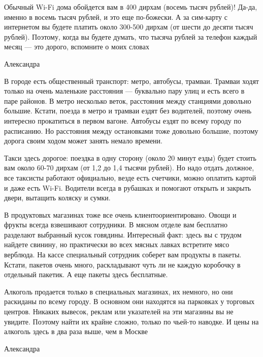 \begin{fancyquotes}
    Обычный Wi-Fi дома обойдется вам в 400 дирхам (восемь тысяч рублей)! Да-да, именно в восемь тысяч рублей, и это еще по-божески. А за сим-карту с интернетом вы будете платить около 300-500 дирхам (от шести до десяти тысяч рублей). Поэтому, когда вы будете думать, что тысяча рублей за телефон каждый месяц — это дорого, вспомните о моих словах

    \begin{flushright}
        Александра
    \end{flushright}
\end{fancyquotes}

В городе есть общественный транспорт: метро, автобусы, трамваи. Трамваи ходят только на очень маленькие расстояния — буквально пару улиц и есть всего в паре районов. В метро несколько веток, расстояния между станциями довольно большие. Кстати, поезда в метро и трамваи ездят без водителей, поэтому очень интересно прокатиться в первом вагоне. Автобусы ездят по всему городу по расписанию. Но расстояния между остановками тоже довольно большие, поэтому дорога своим ходом может занять немало времени.

Такси здесь дорогое: поездка в одну сторону (около 20 минут езды) будет стоить вам около 60-70 дирхам (от 1,2 до 1,4 тысячи рублей). Но надо отдать должное, все таксисты работают официально, везде есть счетчики, можно оплатить картой и даже есть Wi-Fi. Водители всегда в рубашках и помогают открыть и закрыть двери, вытащить коляску и сумки.

В продуктовых магазинах тоже все очень клиентоориентировано. Овощи и фрукты всегда взвешивают сотрудники. В мясном отделе вам бесплатно разделают выбранный кусок говядины. Интересный факт: здесь вы с трудом найдете свинину, но практически во всех мясных лавках встретите мясо верблюда. На кассе специальный сотрудник соберет вам продукты в пакеты. Кстати, пакетов очень много, раскладывают чуть ли не каждую коробочку в отдельный пакетик. А еще пакеты здесь бесплатные.

\begin{fancyquotes}
    Алкоголь продается только в специальных магазинах, их немного, но они раскиданы по всему городу. В основном они находятся на парковках у торговых центров. Никаких вывесок, реклам или указателей на эти магазины вы не увидите. Поэтому найти их крайне сложно, только по чьей-то наводке. И цены на алкоголь здесь в два раза выше, чем в Москве

    \begin{flushright}
        Александра
    \end{flushright}
\end{fancyquotes}


